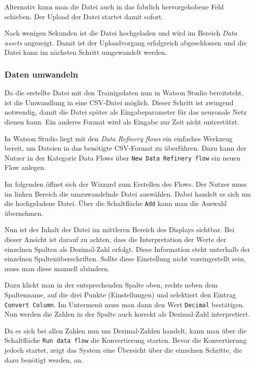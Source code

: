 Alternativ kann man die Datei auch in das fabrlich hervorgehobene Feld schieben. Der Upload der Datei startet damit
sofort.

Nach wenigen Sekunden ist die Datei hochgeladen und wird im Bereich \textit{Data assets} angezeigt. Damit ist der
Uploadvorgang erfolgreich abgeschlossen und die Datei kann im nächsten Schritt umgewandelt werden.

\subsubsection{Daten umwandeln}
Da die erstellte Datei mit den Trainigsdaten nun in Watson Studio bereitsteht, ist die Umwandlung in eine CSV-Datei
möglich. Dieser Schritt ist zwingend notwendig, damit die Datei später als Eingabeparameter für das neuronale Netz
dienen kann. Ein anderes Format wird als Eingabe zur Zeit nicht unterstützt.

In Watson Studio liegt mit den \textit{Data Refinery flows} ein einfaches Werkzeug bereit, um Dateien in das benötigte
CSV-Format zu überführen. Dazu kann der Nutzer in der Kategorie Data Flows über \texttt{New Data Refinery flow} ein
neuen Flow anlegen.

Im folgenden öffnet sich der Wizzard zum Erstellen des Flows. Der Nutzer muss im linken Bereich die umzuwandelnde Datei
auswählen. Dabei handelt es sich um die hochgeladene Datei. Über die Schaltfläche \texttt{Add} kann man die Auswahl
übernehmen.

Nun ist der Inhalt der Datei im mittleren Bereich des Displays sichtbar. Bei dieser Ansicht ist darauf zu achten, dass
die Interpretation der Werte der einzelnen Spalten als Dezimal-Zahl erfolgt. Diese Information steht unterhalb der
einzelnen Spaltenüberschriften. Sollte diese Einstellung nicht voreingestellt sein, muss man diese manuell abändern.

Dazu klickt man in der entsprechenden Spalte oben, rechts neben dem Spaltenname, auf die drei Punkte (Einstellungen) und
selektiert den Eintrag \texttt{Convert Column}. Im Untermenü muss man dann den Wert \texttt{Decimal} bestätigen. Nun
werden die Zahlen in der Spalte auch korrekt als Dezimal-Zahl interpretiert.

Da es sich bei allen Zahlen nun um Dezimal-Zahlen handelt, kann man über die Schaltfläche \texttt{Run data flow} die
Konvertierung starten. Bevor die Konvertierung jedoch startet, zeigt das System eine Übersicht über die einzelnen
Schritte, die dazu benötigt werden, an.

